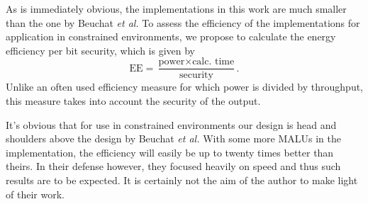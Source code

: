 As is immediately obvious, the implementations in this work are much smaller than the one by Beuchat \emph{et al.} To assess the efficiency of the implementations for application in constrained environments, we propose to calculate the energy efficiency per bit security, which is given by
\begin{displaymath}\text{EE} = \frac{\text{power} \times \text{calc. time}}{\text{security}}.\end{displaymath}
Unlike an often used efficiency measure for which power is divided by throughput, this measure takes into account the security of the output.

It's obvious that for use in constrained environments our design is head and shoulders above the design by Beuchat \emph{et al.} With some more MALUs in the implementation, the efficiency will easily be up to twenty times better than theirs. In their defense however, they focused heavily on speed and thus such results are to be expected. It is certainly not the aim of the author to make light of their work.
